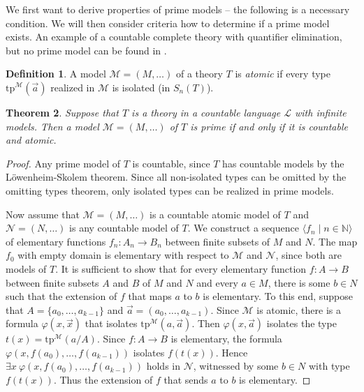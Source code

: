 \documentclass[10pt]{amsart}
\renewcommand{\L}{\mathcal{L}}
\newcommand{\NNN}{\mathbb{N}}
\newcommand{\MM}{\mathcal{M}}
\newcommand{\NN}{\mathcal{N}}
\newcommand{\tp}{\mathrm{tp}}
\newtheorem{theorem}{Theorem}[subsection]
\theoremstyle{definition}
\newtheorem{definition}[theorem]{Definition}
\theoremstyle{remark}
\begin{document}
We first want to derive properties of prime models -- the following is a necessary condition. We will then consider criteria how to determine if a prime model exists. An example of a countable complete theory with quantifier elimination, but no prime model can be found in \cite[p. 60]{MR2908005}. 

\begin{definition} 
A model $\MM=(M,\dots)$ of a theory $T$ is \emph{atomic} if every type $\tp^\MM(\vec{a})$ realized in $\MM$ is isolated (in $S_n(T)$). 
\end{definition} 

\begin{theorem} \label{characterization of prime models} 
Suppose that $T$ is a theory in a countable language $\L$ with infinite models. Then a model $\MM=(M,\dots)$ of $T$ is prime if and only if it is countable and atomic. 
\end{theorem} 
\begin{proof} 
Any prime model of $T$ is countable, since $T$ has countable models by the L\"owenheim-Skolem theorem. Since all non-isolated types can be omitted by the omitting types theorem, only isolated types can be realized in prime models. 

Now assume that $\MM=(M,\dots)$ is a countable atomic model of $T$ and $\NN=(N,\dots)$ is any countable model of $T$. We construct a sequence $\langle f_n\mid n\in\NNN\rangle$ of elementary functions $f_n\colon A_n\rightarrow B_n$ between finite subsets of $M$ and $N$. The map $f_0$ with empty domain is elementary with respect to $\MM$ and $\NN$, since both are models of $T$. 
It is sufficient to show that for every elementary function $f\colon A\rightarrow B$ between finite subsets $A$ and $B$ of $M$ and $N$ and every $a\in M$, there is some $b\in N$ such that the extension of $f$ that maps $a$ to $b$ is elementary. 
To this end, suppose that $A=\{a_0,\dots,a_{k-1}\}$ and $\vec{a}=(a_0,\dots, a_{k-1})$. 
Since $\MM$ is atomic, there is a formula $\varphi(x,\vec{x})$ that isolates $\tp^\MM(a,\vec{a})$. Then $\varphi(x,\vec{a})$ isolates the type $t(x)=\tp^\MM(a/A)$. Since $f\colon A\rightarrow B$ is elementary, the formula $\varphi(x,f(a_0),\dots,f(a_{k-1}))$ isolates $f(t(x))$. Hence $\exists x\ \varphi(x,f(a_0),\dots,f(a_{k-1}))$ holds in $\NN$, witnessed by some $b\in N$ with type $f(t(x))$. Thus the extension of $f$ that sends $a$ to $b$ is elementary. 
\end{proof} 
\end{document}
